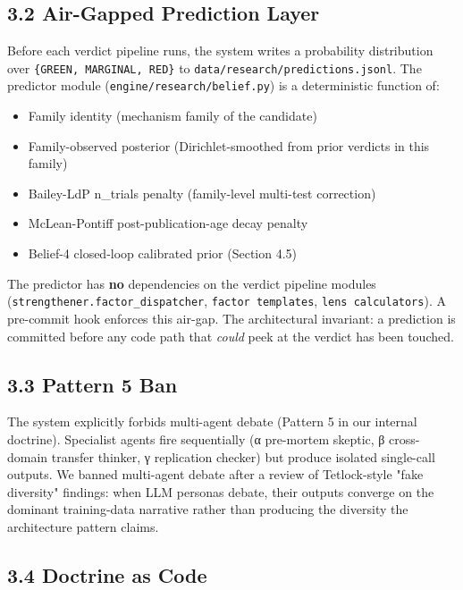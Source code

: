 \documentclass[11pt,a4paper]{article}
\begin{document}
\subsection{3.2 Air-Gapped Prediction Layer}

Before each verdict pipeline runs, the system writes a probability distribution over \texttt{\{GREEN, MARGINAL, RED\}} to \texttt{data/research/predictions.jsonl}. The predictor module (\texttt{engine/research/belief.py}) is a deterministic function of:

\begin{itemize}[leftmargin=*]
\item Family identity (mechanism family of the candidate)
\item Family-observed posterior (Dirichlet-smoothed from prior verdicts in this family)
\item Bailey-LdP n\_trials penalty (family-level multi-test correction)
\item McLean-Pontiff post-publication-age decay penalty
\item Belief-4 closed-loop calibrated prior (Section 4.5)
\end{itemize}

The predictor has \textbf{no} dependencies on the verdict pipeline modules (\texttt{strengthener.factor\_dispatcher}, \texttt{factor templates}, \texttt{lens calculators}). A pre-commit hook enforces this air-gap. The architectural invariant: a prediction is committed before any code path that \textit{could} peek at the verdict has been touched.

\subsection{3.3 Pattern 5 Ban}

The system explicitly forbids multi-agent debate (Pattern 5 in our internal doctrine). Specialist agents fire sequentially (α pre-mortem skeptic, β cross-domain transfer thinker, γ replication checker) but produce isolated single-call outputs. We banned multi-agent debate after a review of Tetlock-style "fake diversity" findings: when LLM personas debate, their outputs converge on the dominant training-data narrative rather than producing the diversity the architecture pattern claims.

\subsection{3.4 Doctrine as Code}
\end{document}
